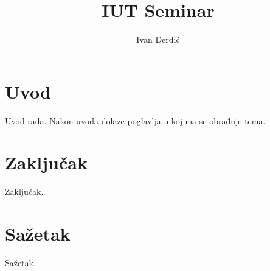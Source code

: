 \documentclass[times, utf8, seminar]{fer}
\begin{document}
\title{IUT Seminar}

\author{Ivan Derdić}

\maketitle

\tableofcontents

\chapter{Uvod}
Uvod rada. Nakon uvoda dolaze poglavlja u kojima se obrađuje tema.




\chapter{Zaključak}
Zaključak.




\chapter{Sažetak}
Sažetak.
\end{document}
